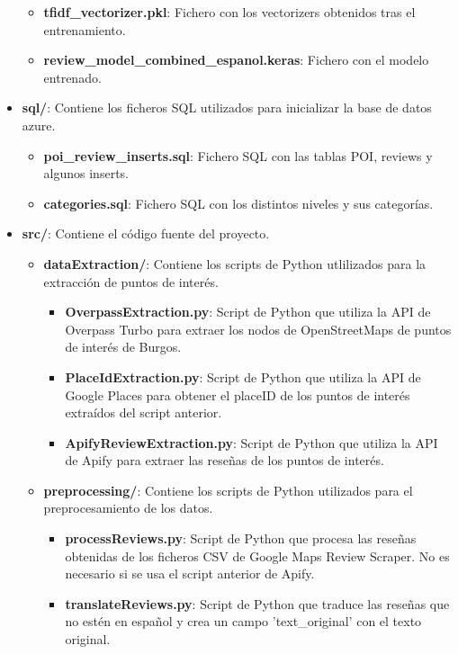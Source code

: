 \begin{itemize}
\begin{itemize}
            \item \textbf{tfidf\_vectorizer.pkl}: Fichero con los vectorizers obtenidos tras el entrenamiento.
            \item \textbf{review\_model\_combined\_espanol.keras}: Fichero con el modelo entrenado.
        \end{itemize}
    \item \textbf{sql/}: Contiene los ficheros SQL utilizados para inicializar la base de datos azure.
        \begin{itemize}
            \item \textbf{poi\_review\_inserts.sql}: Fichero SQL con las tablas POI, reviews y algunos inserts.
            \item \textbf{categories.sql}: Fichero SQL con los distintos niveles y sus categorías.
        \end{itemize}
    \item \textbf{src/}: Contiene el código fuente del proyecto.
        \begin{itemize}
            \item \textbf{dataExtraction/}: Contiene los scripts de Python utlilizados para la extracción de puntos de interés.
                \begin{itemize}
                    \item \textbf{OverpassExtraction.py}: Script de Python que utiliza la API de Overpass Turbo para extraer los nodos de OpenStreetMaps de puntos de interés de Burgos.
                    \item \textbf{PlaceIdExtraction.py}: Script de Python que utiliza la API de Google Places para obtener el placeID de los puntos de interés extraídos del script anterior.
                    \item \textbf{ApifyReviewExtraction.py}: Script de Python que utiliza la API de Apify para extraer las reseñas de los puntos de interés.
                \end{itemize}
            \item \textbf{preprocessing/}: Contiene los scripts de Python utilizados para el preprocesamiento de los datos.
                \begin{itemize}
                    \item \textbf{processReviews.py}: Script de Python que procesa las reseñas obtenidas de los ficheros CSV de Google Maps Review Scraper. No es necesario si se usa el script anterior de Apify.
                    \item \textbf{translateReviews.py}: Script de Python que traduce las reseñas que no estén en español y crea un campo 'text\_original' con el texto original.

\end{itemize}
\end{itemize}
\end{itemize}
